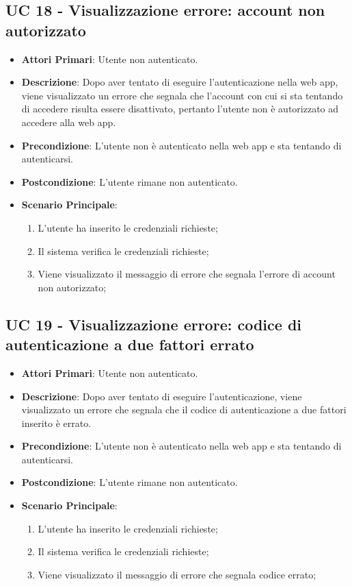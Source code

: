		\subsection{UC 18 - Visualizzazione errore: account non autorizzato}
		\begin{itemize}
			\item \textbf{Attori Primari}: Utente non autenticato.
			\item \textbf{Descrizione}: Dopo aver tentato di eseguire l'autenticazione nella web app, viene visualizzato un errore che segnala che l'account con cui si sta tentando di accedere risulta essere disattivato, pertanto l'utente non è autorizzato ad accedere alla web app.
			\item \textbf{Precondizione}: L'utente non è autenticato nella web app e sta tentando di autenticarsi.
			\item \textbf{Postcondizione}: L'utente rimane non autenticato.
			\item \textbf{Scenario Principale}:
			\begin{enumerate}
				\item L'utente ha inserito le credenziali richieste;
				\item Il sistema verifica le credenziali richieste;
				\item Viene visualizzato il messaggio di errore che segnala l'errore di account non autorizzato;
			\end{enumerate}
		\end{itemize}


		\subsection{UC 19 - Visualizzazione errore: codice di autenticazione a due fattori errato}
		\begin{itemize}
			\item \textbf{Attori Primari}: Utente non autenticato.
			\item \textbf{Descrizione}: Dopo aver tentato di eseguire l'autenticazione, viene visualizzato un errore che segnala che il codice di autenticazione a due fattori inserito è errato.
			\item \textbf{Precondizione}: L'utente non è autenticato nella web app e sta tentando di autenticarsi.
			\item \textbf{Postcondizione}: L'utente rimane non autenticato.
			\item \textbf{Scenario Principale}:
			\begin{enumerate}
				\item L'utente ha inserito le credenziali richieste;
				\item Il sistema verifica le credenziali richieste;
				\item Viene visualizzato il messaggio di errore che segnala codice errato;
			\end{enumerate}
		\end{itemize}


